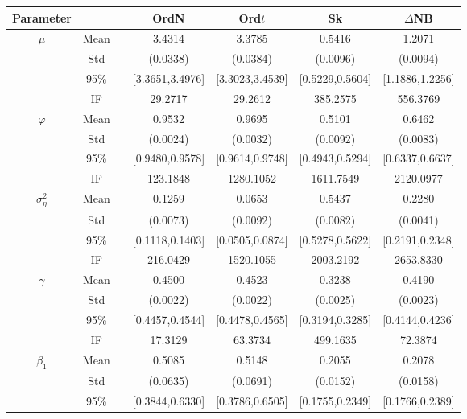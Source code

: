 \begin{table} 
\center 
\tabcolsep=0.07cm 
\begin{footnotesize} 
\begin{singlespace} 
\begin{tabular}{ccc cccc } 
\toprule 
Parameter &&& OrdN  & Ord$t$ & Sk & $\Delta$NB \\ \hline
 $\mu$   & Mean   &  &  3.4314  &  3.3785  &  0.5416  &  1.2071  \\  
 & Std   &  &  (0.0338)  &  (0.0384)  &  (0.0096)  &  (0.0094)  \\  
 & 95\%  &  &  [3.3651,3.4976]  &  [3.3023,3.4539]  &  [0.5229,0.5604]  &  [1.1886,1.2256]  \\  
 & IF  &  &  29.2717  &  29.2612  &  385.2575  &  556.3769  \\ [1.0ex] 
 $\varphi$   & Mean   &  &  0.9532  &  0.9695  &  0.5101  &  0.6462  \\  
 & Std   &  &  (0.0024)  &  (0.0032)  &  (0.0092)  &  (0.0083)  \\  
 & 95\%  &  &  [0.9480,0.9578]  &  [0.9614,0.9748]  &  [0.4943,0.5294]  &  [0.6337,0.6637]  \\  
 & IF  &  &  123.1848  &  1280.1052  &  1611.7549  &  2120.0977  \\ [1.0ex] 
 $\sigma^2_{\eta}$   & Mean   &  &  0.1259  &  0.0653  &  0.5437  &  0.2280  \\  
 & Std   &  &  (0.0073)  &  (0.0092)  &  (0.0082)  &  (0.0041)  \\  
 & 95\%  &  &  [0.1118,0.1403]  &  [0.0505,0.0874]  &  [0.5278,0.5622]  &  [0.2191,0.2348]  \\  
 & IF  &  &  216.0429  &  1520.1055  &  2003.2192  &  2653.8330  \\ [1.0ex] 
 $\gamma$   & Mean   &  &  0.4500  &  0.4523  &  0.3238  &  0.4190  \\  
 & Std   &  &  (0.0022)  &  (0.0022)  &  (0.0025)  &  (0.0023)  \\  
 & 95\%  &  &  [0.4457,0.4544]  &  [0.4478,0.4565]  &  [0.3194,0.3285]  &  [0.4144,0.4236]  \\  
 & IF  &  &  17.3129  &  63.3734  &  499.1635  &  72.3874  \\ [1.0ex] 
 $\beta_1$   & Mean   &  &  0.5085  &  0.5148  &  0.2055  &  0.2078  \\  
 & Std   &  &  (0.0635)  &  (0.0691)  &  (0.0152)  &  (0.0158)  \\  
 & 95\%  &  &  [0.3844,0.6330]  &  [0.3786,0.6505]  &  [0.1755,0.2349]  &  [0.1766,0.2389]  \\  

\end{tabular}
\end{singlespace}
\end{footnotesize}
\end{table}

